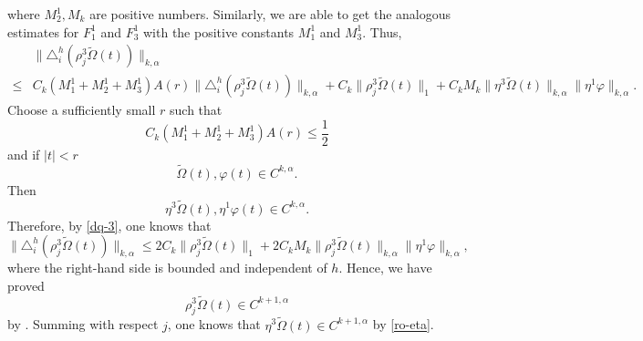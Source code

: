 \documentclass[12pt]{amsart}
\numberwithin{equation}{section}
\renewcommand{\1}{\mathds{1}}
\renewcommand{\>}{\rightarrow}
\begin{document}
where $M_2^1,M_k$ are positive numbers. Similarly, we are able to
get the analogous estimates for $F_1^1$ and $F_3^1$ with the positive
constants $M_1^1$ and $M_3^1$. Thus,
\begin{equation}\label{dq-3}
\begin{aligned}
   &\| \triangle^h_i(\rho_j^3\tilde{\Omega}(t))\|_{k, \alpha}\\
\leq&C_k(M_1^1+M_2^1+M_3^1)A(r)\|\triangle^h_i(\rho_j^3\tilde{\Omega}(t))\|_{k,
\alpha}+C_k\|\rho_j^3\tilde{\Omega}(t)\|_{1}+C_kM_k\|\eta^3\tilde{\Omega}(t)\|_{k,
\alpha}\|\eta^1\varphi\|_{k,
 \alpha}.
\end{aligned}
\end{equation}
Choose a sufficiently small $r$ such that
\begin{equation}\label{r-1/2}
C_k(M_1^1+M_2^1+M_3^1)A(r)\leq \frac{1}{2}
\end{equation}
and if $|t|<r$
\begin{equation}\label{r-om-phi}
\tilde{\Omega}(t), \varphi(t) \in C^{k, \alpha}.
\end{equation}
Then $$\label{} \eta^3\tilde{\Omega}(t), \eta^1\varphi(t) \in C^{k,
\alpha}.
$$
Therefore, by \eqref{dq-3}, one knows that
$$
   \| \triangle^h_i(\rho_j^3\tilde{\Omega}(t))\|_{k, \alpha}
\leq
2C_k\|\rho_j^3\tilde{\Omega}(t)\|_{1}+2C_kM_k\|\rho_j^3\tilde{\Omega}(t)\|_{k,
\alpha}\|\eta^1\varphi\|_{k,
 \alpha},
$$
where the right-hand side is bounded and independent of $h$. Hence,
we have proved $$\rho_j^3\tilde{\Omega}(t)\in C^{k+1, \alpha}$$ by
\cite[Appendix Lemma 8.2.(iii)]{k}. Summing with respect $j$, one
knows that $\eta^3\tilde{\Omega}(t)\in C^{k+1, \alpha}$ by
\eqref{ro-eta}.
\end{document}
